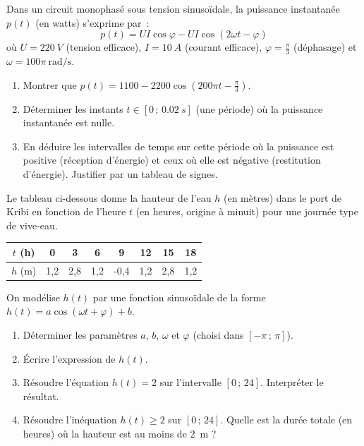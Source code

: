 \documentclass[11pt]{article}
\begin{document}
\begin{exercice}
Dans un circuit monophasé sous tension sinusoïdale, la puissance instantanée $p(t)$ (en watts) s'exprime par~:
\[
p(t) = U I \cos \varphi - U I \cos(2\omega t - \varphi)
\]
où $U = \SI{220}{V}$ (tension efficace), $I = \SI{10}{A}$ (courant efficace), $\varphi = \frac{\pi}{3}$ (déphasage) et $\omega = 100\pi~\text{rad/s}$.
\begin{enumerate}
    \item Montrer que $p(t) = 1100 - 2200 \cos\left(200\pi t - \frac{\pi}{3}\right)$.
    \item Déterminer les instants $t \in [0\,;\, \SI{0,02}{s}]$ (une période) où la puissance instantanée est nulle.
    \item En déduire les intervalles de temps sur cette période où la puissance est positive (réception d'énergie) et ceux où elle est négative (restitution d'énergie). Justifier par un tableau de signes.
\end{enumerate}
\end{exercice}

\begin{exercice}
Le tableau ci-dessous donne la hauteur de l'eau $h$ (en mètres) dans le port de Kribi en fonction de l'heure $t$ (en heures, origine à minuit) pour une journée type de vive-eau.

\begin{center}
\begin{tabular}{|c|c|c|c|c|c|c|c|}
\hline
$t$ (h) & 0 & 3 & 6 & 9 & 12 & 15 & 18 \\ \hline
$h$ (m) & 1,2 & 2,8 & 1,2 & -0,4 & 1,2 & 2,8 & 1,2 \\ \hline
\end{tabular}
\end{center}
On modélise $h(t)$ par une fonction sinusoïdale de la forme $h(t) = a \cos(\omega t + \varphi) + b$.
\begin{enumerate}
    \item Déterminer les paramètres $a$, $b$, $\omega$ et $\varphi$ (choisi dans $[-\pi\,;\,\pi]$).
    \item Écrire l'expression de $h(t)$.
    \item Résoudre l'équation $h(t) = 2$ sur l'intervalle $[0\,;\, 24]$. Interpréter le résultat.
    \item Résoudre l'inéquation $h(t) \geq 2$ sur $[0\,;\, 24]$. Quelle est la durée totale (en heures) où la hauteur est au moins de \SI{2}{m} ?
\end{enumerate}
\end{exercice}
\end{document}
